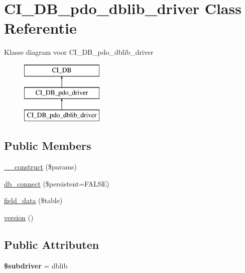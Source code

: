 \hypertarget{class_c_i___d_b__pdo__dblib__driver}{}\section{C\+I\+\_\+\+D\+B\+\_\+pdo\+\_\+dblib\+\_\+driver Class Referentie}
\label{class_c_i___d_b__pdo__dblib__driver}
Klasse diagram voor C\+I\+\_\+\+D\+B\+\_\+pdo\+\_\+dblib\+\_\+driver\begin{figure}[H]
\begin{center}
\leavevmode
\includegraphics[height=3.000000cm]{class_c_i___d_b__pdo__dblib__driver}
\end{center}
\end{figure}
\subsection*{Public Members}
\begin{DoxyCompactItemize}
\item 
\mbox{\hyperlink{class_c_i___d_b__pdo__dblib__driver_a9162320adff1a1a4afd7f2372f753a3e}{\+\_\+\+\_\+construct}} (\$params)
\item 
\mbox{\hyperlink{class_c_i___d_b__pdo__dblib__driver_a52bf595e79e96cc0a7c907a9b45aeb4d}{db\+\_\+connect}} (\$persistent=F\+A\+L\+SE)
\item 
\mbox{\hyperlink{class_c_i___d_b__pdo__dblib__driver_a90355121e1ed009e0efdbd544ab56efa}{field\+\_\+data}} (\$table)
\item 
\mbox{\hyperlink{class_c_i___d_b__pdo__dblib__driver_a6080dae0886626b9a4cedb29240708b1}{version}} ()
\end{DoxyCompactItemize}
\subsection*{Public Attributen}
\begin{DoxyCompactItemize}
\item 
\mbox{\label{class_c_i___d_b__pdo__dblib__driver_a1322ca756348b11d080cb7a4f590de15}} 
{\bfseries \$subdriver} = \textquotesingle{}dblib\textquotesingle{}
\end{DoxyCompactItemize}
